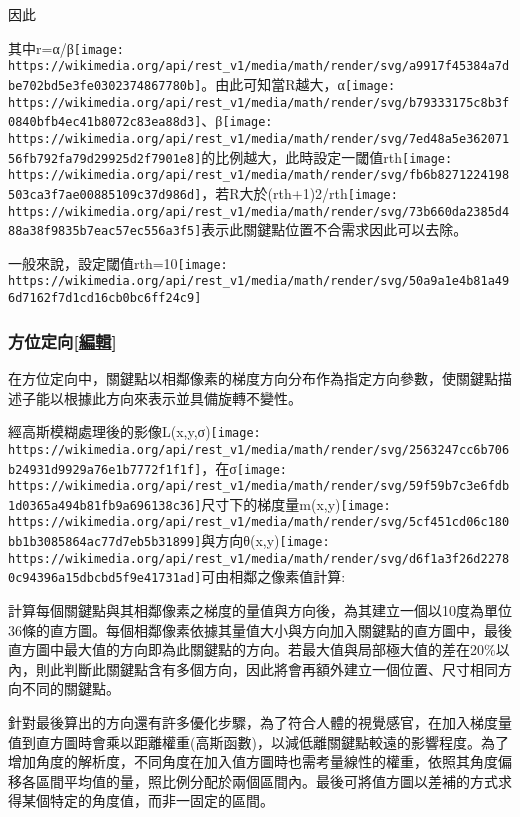 \documentclass[
]{article}
\begin{document}
因此

其中r=α/β\texttt{[image: https://wikimedia.org/api/rest\_v1/media/math/render/svg/a9917f45384a7dbe702bd5e3fe0302374867780b]}。由此可知當R越大，α\texttt{[image: https://wikimedia.org/api/rest\_v1/media/math/render/svg/b79333175c8b3f0840bfb4ec41b8072c83ea88d3]}、β\texttt{[image: https://wikimedia.org/api/rest\_v1/media/math/render/svg/7ed48a5e36207156fb792fa79d29925d2f7901e8]}的比例越大，此時設定一閾值rth\texttt{[image: https://wikimedia.org/api/rest\_v1/media/math/render/svg/fb6b8271224198503ca3f7ae00885109c37d986d]}，若R大於(rth+1)2/rth\texttt{[image: https://wikimedia.org/api/rest\_v1/media/math/render/svg/73b660da2385d488a38f9835b7eac57ec556a3f5]}表示此關鍵點位置不合需求因此可以去除。

一般來說，設定閾值rth=10\texttt{[image: https://wikimedia.org/api/rest\_v1/media/math/render/svg/50a9a1e4b81a496d7162f7d1cd16cb0bc6ff24c9]}

\hypertarget{header-n58}{%
\subsubsection{\texorpdfstring{方位定向{[}\href{https://zh.wikipedia.org/w/index.php?title=尺度不變特徵轉換\&action=edit\&section=8}{編輯}{]}}{方位定向{[}編輯{]}}}\label{header-n58}}

在方位定向中，關鍵點以相鄰像素的梯度方向分布作為指定方向參數，使關鍵點描述子能以根據此方向來表示並具備旋轉不變性。

經高斯模糊處理後的影像L(x,y,σ)\texttt{[image: https://wikimedia.org/api/rest\_v1/media/math/render/svg/2563247cc6b706b24931d9929a76e1b7772f1f1f]}，在σ\texttt{[image: https://wikimedia.org/api/rest\_v1/media/math/render/svg/59f59b7c3e6fdb1d0365a494b81fb9a696138c36]}尺寸下的梯度量m(x,y)\texttt{[image: https://wikimedia.org/api/rest\_v1/media/math/render/svg/5cf451cd06c180bb1b3085864ac77d7eb5b31899]}與方向θ(x,y)\texttt{[image: https://wikimedia.org/api/rest\_v1/media/math/render/svg/d6f1a3f26d22780c94396a15dbcbd5f9e41731ad]}可由相鄰之像素值計算:

計算每個關鍵點與其相鄰像素之梯度的量值與方向後，為其建立一個以10度為單位36條的直方圖。每個相鄰像素依據其量值大小與方向加入關鍵點的直方圖中，最後直方圖中最大值的方向即為此關鍵點的方向。若最大值與局部極大值的差在20\%以內，則此判斷此關鍵點含有多個方向，因此將會再額外建立一個位置、尺寸相同方向不同的關鍵點。

針對最後算出的方向還有許多優化步驟，為了符合人體的視覺感官，在加入梯度量值到直方圖時會乘以距離權重(高斯函數)，以減低離關鍵點較遠的影響程度。為了增加角度的解析度，不同角度在加入值方圖時也需考量線性的權重，依照其角度偏移各區間平均值的量，照比例分配於兩個區間內。最後可將值方圖以差補的方式求得某個特定的角度值，而非一固定的區間。
\end{document}
